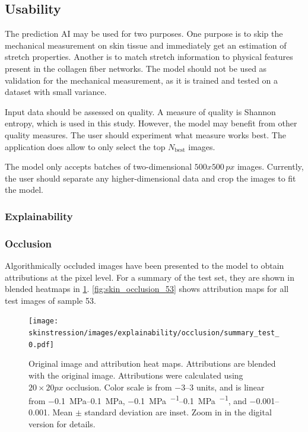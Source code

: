 \subsection{Usability}
The prediction AI may be used for two purposes.
One purpose is to skip the mechanical measurement on skin tissue and immediately get an estimation of stretch properties.
Another is to match stretch information to physical features present in the collagen fiber networks.
The model should not be used as validation for the mechanical measurement, as it is trained and tested on a dataset with small variance.

Input data should be assessed on quality.
A measure of quality is Shannon entropy, which is used in this study.
However, the model may benefit from other quality measures.
The user should experiment what measure works best.
The application does allow to only select the top $N_\mathrm{best}$ images.

The model only accepts batches of two-dimensional $500x500\,\unit{px}$ images.
Currently, the user should separate any higher-dimensional data and crop the images to fit the model.

\subsubsection{Explainability}

\subsubsection{Occlusion}
Algorithmically occluded images have been presented to the model to obtain attributions at the pixel level.
For a summary of the test set, they are shown in blended heatmaps in \cref{fig:skin_occlusion}.
\cref{fig:skin_occlusion_53} shows attribution maps for all test images of sample 53.

\begin{figure}
    \centering
    \texttt{[image: skinstression/images/explainability/occlusion/summary\_test\_0.pdf]}
    \caption[Original image and attribution heat maps]{
        Original image and attribution heat maps.
        Attributions are blended with the original image.
        Attributions were calculated using $20\times 20\unit{px}$ occlusion.
        Color scale is from \numrange{-3}{3} units, and is linear from \qtyrange{-0.1}{0.1}{\mega\pascal}, \qtyrange{-0.1}{0.1}{\mega\pascal\per\stretch}, and \qtyrange{-0.001}{0.001}{\stretch}.
        Mean $\pm$ standard deviation are inset.
        Zoom in in the digital version for details.
    }
    \label{fig:skin_occlusion}
\end{figure}


